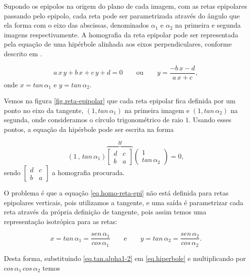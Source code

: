 Supondo os epipolos na origem do plano de cada imagem, com as retas epipolares passando pelo epipolo, cada reta pode ser parametrizada através do ângulo que ela forma com o eixo das abscissas, denominados $\alpha_1$ e $\alpha_2$ na primeira e segunda imagens respectivamente.
A homografia da reta epipolar pode ser representada pela equação de uma hipérbole alinhada aos eixos perpendiculares, conforme descrito em \cite{Fabbri:Kimia:IJCV2015}.

\begin{equation}\label{eq.hiperbole}
a\,x\,y+b\,x+c\,y+d=0 \qquad \text{ou} \qquad y=\frac{-b\,x-d}{a\,x+c},
\end{equation} 
onde $x=tan\,\alpha_1$ e $y=tan\,\alpha_2$. 

Vemos na figura \ref{fig.reta-epipolar} que cada reta epipolar fica definida por um ponto no eixo da tangente, $(1,tan\,\alpha_1)$ na primeira imagem e $(1,tan\,\alpha_2)$ na segunda, onde consideramos o círculo trigonométrico de raio $1$. Usando esses pontos, a equação da hipérbole pode ser escrita na forma

\begin{equation}\label{eq.homo-reta-epi}
(1\,,\,tan\,\alpha_1)
\overbrace{
\begin{bmatrix}
d&c\\
b&a
\end{bmatrix}
}^{H}
\begin{pmatrix}
1\\
tan\,\alpha_2
\end{pmatrix}
=0,
\end{equation}
sendo 
$\begin{bmatrix}d&c\\b&a\end{bmatrix}$ a homografia procurada.

O problema é que a equação \ref{eq.homo-reta-epi} não está definida para retas epipolares verticais, pois utilizamos a tangente, e uma saída é parametrizar cada reta através da própria definição de tangente, pois assim temos uma representação isotrópica para as retas:

\begin{equation}\label{eq.tan.alpha1-2}
x=tan\,\alpha_1=\frac{sen\,\alpha_1 }{cos\,\alpha_1} \qquad \text{e} \qquad y=tan\,\alpha_2=\frac{sen\,\alpha_2}{cos\,\alpha_2}.
\end{equation} 

Desta forma, substituindo \ref{eq.tan.alpha1-2} em \ref{eq.hiperbole} e multiplicando por $cos\,\alpha_1\,cos\,\alpha_2$ temos

